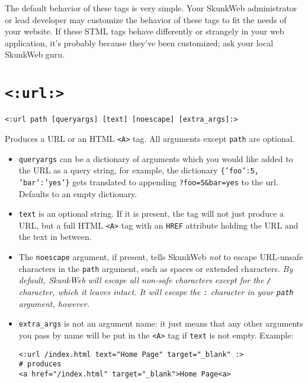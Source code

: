 \documentclass{manual}
\begin{document}
{{The default behavior of these tags is very simple.  Your SkunkWeb
administrator or lead developer may customize the behavior of these
tags to fit the needs of your website.  If these STML tags behave
differently or strangely in your web application, it's probably
because they've been customized; ask your local SkunkWeb guru.

\section{\texttt{<:url:>}}
\label{tagurl}

\begin{verbatim}<:url path [queryargs] [text] [noescape] [extra_args]:>\end{verbatim}

Produces a URL or an HTML \texttt{<A>} tag. 
All arguments except \texttt{path} are optional.

\begin{itemize}
\item \texttt{queryargs} can be a dictionary of arguments which you
would like added to the URL as a query string, for example, the
dictionary \texttt{\{'foo':5, 'bar':'yes'\}} gets translated to
appending \texttt{?foo=5\&bar=yes} to the url. Defaults to an empty
dictionary.

\item \texttt{text} is an optional string. If it is present, the tag
will not just produce a URL, but a full HTML \texttt{<A>}
tag with an \texttt{HREF} attribute holding the URL and the text in
between. 

\item The \texttt{noescape} argument, if present,
tells SkunkWeb \emph{not} to escape URL-unsafe characters in the \texttt{path}
argument, such as spaces or extended characters. \emph{By default,
SkunkWeb will escape all non-safe characters except for the \texttt{/}
character, which it leaves intact. It will escape the \texttt{:}
character in your \texttt{path} argument, however.}


\item \texttt{extra_args} is not an argument name: it just means 
that any other arguments you pass by name will be put in the
\texttt{<A>} tag if \texttt{text} is not empty. Example:

\begin{verbatim}<:url /index.html text="Home Page" target="_blank" :>
# produces
<a href="/index.html" target="_blank">Home Page<a>
\end{verbatim}




\end{itemize}}}
\end{document}
